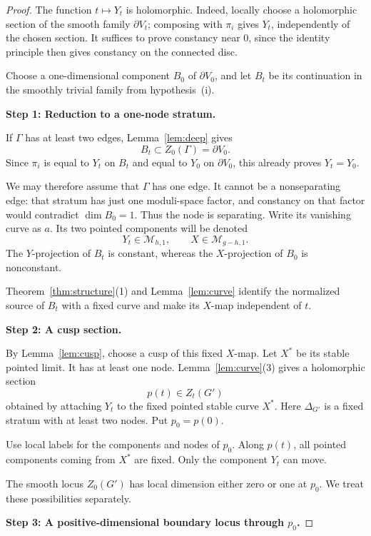 \documentclass[11pt]{article}
\newcommand{\M}{\mathcal M}
\theoremstyle{remark}
\begin{document}
\begin{proof}
The function \(t\mapsto Y_t\) is holomorphic. Indeed, locally
choose a holomorphic section of the smooth family
\(\partial V_t\); composing with \(\pi_i\) gives \(Y_t\),
independently of the chosen section. It suffices to prove
constancy near \(0\), since the identity principle then gives
constancy on the connected disc.

Choose a one-dimensional component \(B_0\) of
\(\partial V_0\), and let \(B_t\) be its continuation in the
smoothly trivial family from hypothesis~(i).

\medskip
\noindent\textbf{Step 1: Reduction to a one-node stratum.}

If \(\Gamma\) has at least two edges,
Lemma~\ref{lem:deep} gives
\[
B_t\subset Z_0(\Gamma)=\partial V_0.
\]
Since \(\pi_i\) is equal to \(Y_t\) on \(B_t\) and equal to
\(Y_0\) on \(\partial V_0\), this already proves \(Y_t=Y_0\).

We may therefore assume that \(\Gamma\) has one edge.
It cannot be a nonseparating edge: that stratum has just one
moduli-space factor, and constancy on that factor would
contradict \(\dim B_0=1\). Thus the node is separating.
Write its vanishing curve as \(a\). Its two pointed components
will be denoted
\[
Y_t\in\M_{h,1},
\qquad
X\in\M_{g-h,1}.
\]
The \(Y\)-projection of \(B_t\) is constant, whereas the
\(X\)-projection of \(B_0\) is nonconstant.

Theorem~\ref{thm:structure}(1) and
Lemma~\ref{lem:curve} identify the normalized source of \(B_t\)
with a fixed curve and make its \(X\)-map independent of \(t\).

\medskip
\noindent\textbf{Step 2: A cusp section.}

By Lemma~\ref{lem:cusp}, choose a cusp of this fixed
\(X\)-map. Let \(X^\ast\) be its stable pointed limit.
It has at least one node. Lemma~\ref{lem:curve}(3) gives a
holomorphic section
\[
p(t)\in Z_t(G')
\]
obtained by attaching \(Y_t\) to the fixed pointed stable curve
\(X^\ast\). Here \(\Delta_{G'}\) is a fixed stratum with at least
two nodes. Put \(p_0=p(0)\).

Use local labels for the components and nodes of \(p_0\).
Along \(p(t)\), all pointed components coming from \(X^\ast\)
are fixed. Only the component \(Y_t\) can move.

The smooth locus \(Z_0(G')\) has local dimension either zero
or one at \(p_0\). We treat these possibilities separately.

\medskip
\noindent\textbf{Step 3: A positive-dimensional boundary locus
through \(p_0\).}


\end{proof}
\end{document}
